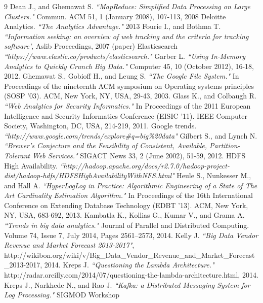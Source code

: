 \documentclass[a4paper, 12pt]{report}
\numberwithin{equation}{section}
\begin{document}
\begin{thebibliography}{9}
    Dean J., and Ghemawat S. 
	\emph{``MapReduce: Simplified Data Processing on Large Clusters."} Commun. ACM 51, 1 (January 2008), 107-113, 2008
	  Deloitte Analytics. 
	\emph{``The Analytics Advantage."} 2013
    Fourie I., and Bothma T.
    \emph{``Information seeking: an overview of web tracking and the criteria for tracking software'}, Aslib Proceedings, 2007 (paper)
     Elasticsearch
    \emph{``https://www.elastic.co/products/elasticsearch."}
    Garber L. 
    \emph{``Using In-Memory Analytics to Quickly Crunch Big Data."} Computer 45, 10 (October 2012), 16-18, 2012.
     Ghemawat S., Gobioff H., and Leung S.
    \emph{``The Google File System."}
    In Proceedings of the nineteenth ACM symposium on Operating systems principles (SOSP '03). ACM, New York, NY, USA, 29-43, 2003.
    Glass K., and Colbaugh R.
    \emph{``Web Analytics for Security Informatics."} In Proceedings of the 2011 European Intelligence and Security Informatics Conference (EISIC '11). IEEE Computer Society, Washington, DC, USA, 214-219, 2011.
 	 Google trends. 
    \emph{``http://www.google.com/trends/explore\#q=big\%20data"}
    Gilbert S., and Lynch N. 
    \emph{``Brewer’s Conjecture and the Feasibility of Consistent, Available, Partition-Tolerant Web Services."} SIGACT News 33, 2 (June 2002), 51-59, 2012.
     HDFS High Availability. 
	\emph{``http://hadoop.apache.org/docs/r2.7.0/hadoop-project-dist/hadoop-hdfs/HDFSHighAvailabilityWithNFS.html"}
    Heule S., Nunkesser M., and Hall A. 
    \emph{``HyperLogLog in Practice: Algorithmic Engineering of a
State of The Art Cardinality Estimation Algorithm."} In Proceedings of the 16th International Conference on Extending Database Technology (EDBT '13). ACM, New York, NY, USA, 683-692, 2013.
	Kambatla K., Kollias G., Kumar V., and Grama A.
	 \emph{``Trends in big data analytics."} Journal of Parallel and Distributed Computing. Volume 74, Issue 7, July 2014, Pages 2561–2573, 2014.
	Kelly J.
    \emph{``Big Data Vendor Revenue and Market Forecast 2013-2017"}, http://wikibon.org/wiki/v/Big\_Data\_Vendor\_Revenue\_and\_Market\_Forecast\_2013-2017, 2014.
	Kreps J. 
    \emph{``Questioning the Lambda Architecture."} http://radar.oreilly.com/2014/07/questioning-the-lambda-architecture.html, 2014.
    Kreps J., Narkhede N., and Rao J.      
 	\emph{``Kafka: a Distributed Messaging System for Log Processing."} SIGMOD Workshop

\end{thebibliography}
\end{document}

